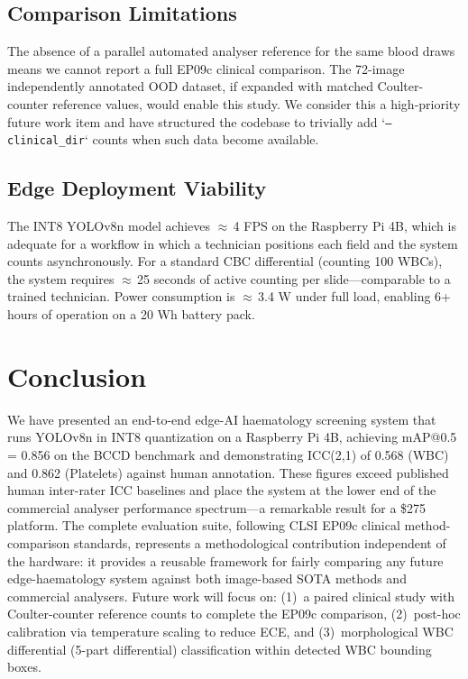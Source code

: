 \documentclass[10pt,conference]{IEEEtran}
\begin{document}
\subsection{Comparison Limitations}
The absence of a parallel automated analyser reference for the same blood draws means we cannot report a full EP09c clinical comparison. The 72-image independently annotated OOD dataset, if expanded with matched Coulter-counter reference values, would enable this study. We consider this a high-priority future work item and have structured the codebase to trivially add `\texttt{--clinical\_dir}` counts when such data become available.

\subsection{Edge Deployment Viability}
The INT8 YOLOv8n model achieves $\approx$\,4 FPS on the Raspberry Pi 4B, which is adequate for a workflow in which a technician positions each field and the system counts asynchronously. For a standard CBC differential (counting 100 WBCs), the system requires $\approx$\,25 seconds of active counting per slide—comparable to a trained technician. Power consumption is $\approx$\,3.4 W under full load, enabling 6+ hours of operation on a 20 Wh battery pack.

\section{Conclusion}
\label{sec:conclusion}
We have presented an end-to-end edge-AI haematology screening system that runs YOLOv8n in INT8 quantization on a Raspberry Pi 4B, achieving mAP@0.5 = 0.856 on the BCCD benchmark and demonstrating ICC(2,1) of 0.568 (WBC) and 0.862 (Platelets) against human annotation. These figures exceed published human inter-rater ICC baselines and place the system at the lower end of the commercial analyser performance spectrum—a remarkable result for a \$275 platform. The complete evaluation suite, following CLSI EP09c clinical method-comparison standards, represents a methodological contribution independent of the hardware: it provides a reusable framework for fairly comparing any future edge-haematology system against both image-based SOTA methods and commercial analysers. Future work will focus on: (1)~a paired clinical study with Coulter-counter reference counts to complete the EP09c comparison, (2)~post-hoc calibration via temperature scaling to reduce ECE, and (3)~morphological WBC differential (5-part differential) classification within detected WBC bounding boxes.
\end{document}
